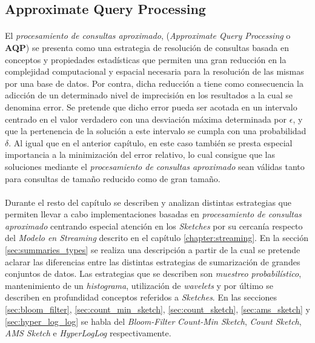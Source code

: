 \documentclass{subfiles}
\begin{document}
      \subsection{Approximate Query Processing}
      \label{sec:aproximate_query_processing}

        \paragraph{}
        El \emph{procesamiento de consultas aproximado}, (\emph{Approximate Query Processing} o \textbf{AQP}) se presenta como una estrategia de resolución de consultas basada en conceptos y propiedades estadísticas que permiten una gran reducción en la complejidad computacional y espacial necesaria para la resolución de las mismas por una base de datos. Por contra, dicha reducción a tiene como consecuencia la adicción de un determinado nivel de imprecisión en los resultados a la cual se denomina error. Se pretende que dicho error pueda ser acotada en un intervalo centrado en el valor verdadero con una desviación máxima determinada por $\epsilon$, y que la pertenencia de la solución a este intervalo se cumpla con una probabilidad $\delta$. Al igual que en el anterior capítulo, en este caso también se presta especial importancia a la minimización del error relativo, lo cual consigue que las soluciones mediante el \emph{procesamiento de consultas aproximado} sean válidas tanto para consultas de tamaño reducido como de gran tamaño.


      \paragraph{}
      Durante el resto del capítulo se describen y analizan distintas estrategias que permiten llevar a cabo implementaciones basadas en \emph{procesamiento de consultas aproximado} centrando especial atención en los \emph{Sketches} por su cercanía respecto del \emph{Modelo en Streaming} descrito en el capítulo \ref{chapter:streaming}. En la sección \ref{sec:summaries_types} se realiza una descripción a partir de la cual se pretende aclarar las diferencias entre las distintas estrategias de sumarización de grandes conjuntos de datos. Las estrategias que se describen son \emph{muestreo probabilístico}, mantenimiento de un \emph{histograma}, utilización de \emph{wavelets} y por último se describen en profundidad conceptos referidos a \emph{Sketches}. En las secciones \ref{sec:bloom_filter}, \ref{sec:count_min_sketch}, \ref{sec:count_sketch}, \ref{sec:ams_sketch} y \ref{sec:hyper_log_log} se habla del \emph{Bloom-Filter} \emph{Count-Min Sketch}, \emph{Count Sketch}, \emph{AMS Sketch} e \emph{HyperLogLog} respectivamente.
\end{document}
